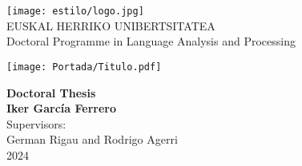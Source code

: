 \documentclass[a4paper,12pt]{article}
\begin{document}
\begin{center}
\texttt{[image: estilo/logo.jpg]}\\[0.5cm]
{\large \textsf{\textcolor{urrea}{EUSKAL HERRIKO UNIBERTSITATEA}}}\\[0.2cm]
{\small \textsf{Doctoral Programme in Language Analysis and Processing}}%
\end{center}

\begin{center}
\vspace*{\fill}
\centering
\texttt{[image: Portada/Titulo.pdf]}
\vspace*{\fill}
\end{center}

\begin{center}
{\large \textsf{\textbf{{Doctoral Thesis}}}}\\[0.2cm]
{\Large \textsf{\textbf{Iker García Ferrero}}}\\[0.5cm]
{\textsf{\small Supervisors:}}\\
{\textsf{\small German Rigau and Rodrigo Agerri}}\\[0.5cm]
{\large \textsf{2024}}
\end{center}
\end{document}
